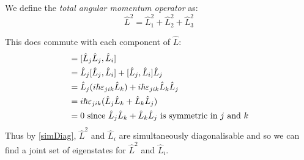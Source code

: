 \documentclass[../main.tex]{subfiles}
\begin{document}
\begin{definition}
  We define the \textit{total angular momentum operator} as:
  \[
    \hat{L}^2 = \hat{L}^2_1 + \hat{L}^2_2 + \hat{L}^2_3
  \]
\end{definition}
This does commute with each component of $\hat{L}$:
\begin{align*}
  [\hat{L}^2, \hat{L}_i] &= [\hat{L}_j \hat{L}_j, \hat{L}_i] \\
                         &= \hat{L}_j[\hat{L}_j, \hat{L}_i] + [\hat{L}_j, \hat{L}_i] \hat{L}_j \\
                         &= \hat{L}_j(i\hbar\levi_{j i k}\hat{L}_k) + i\hbar\levi_{j i k}\hat{L}_k \hat{L}_j \\
                         &= i\hbar\levi_{j i k}(\hat{L}_j\hat{L}_k + \hat{L}_k \hat{L}_j) \\
                         &= 0 \text{ since } \hat{L}_j\hat{L}_k + \hat{L}_k \hat{L}_j \text{ is symmetric in $j$ and $k$}
\end{align*}
Thus by \cref{simDiag}, $\hat{L}^2$ and $\hat{L}_i$ are simultaneously diagonalisable and so we can find a joint set of eigenstates for $\hat{L}^2$ and $\hat{L}_i$.
\end{document}
